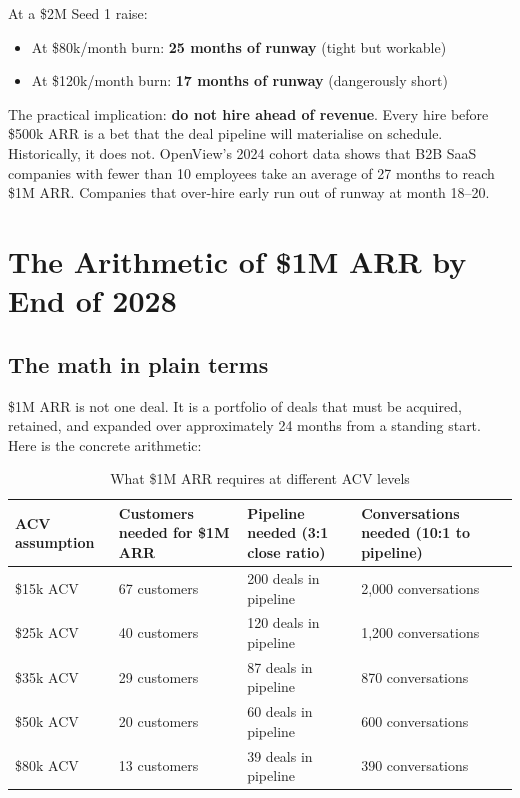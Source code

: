 At a \$2M Seed 1 raise:
\begin{itemize}[leftmargin=1.5em,itemsep=2pt]
  \item At \$80k/month burn: \textbf{25 months of runway} (tight but workable)
  \item At \$120k/month burn: \textbf{17 months of runway} (dangerously short)
\end{itemize}

The practical implication: \textbf{do not hire ahead of revenue}. Every hire
before \$500k ARR is a bet that the deal pipeline will materialise on schedule.
Historically, it does not. OpenView's 2024 cohort data shows that B2B SaaS
companies with fewer than 10 employees take an average of 27 months to reach
\$1M ARR. Companies that over-hire early run out of runway at month 18--20.

\section{The Arithmetic of \$1M ARR by End of 2028}

\subsection{The math in plain terms}

\$1M ARR is not one deal. It is a portfolio of deals that must be acquired,
retained, and expanded over approximately 24 months from a standing start.
Here is the concrete arithmetic:

\begin{table}[H]
\centering
\renewcommand{\arraystretch}{1.55}
\begin{tabularx}{\textwidth}{@{}lXXX@{}}
\toprule
\textbf{ACV assumption} & \textbf{Customers needed for \$1M ARR} & \textbf{Pipeline needed (3:1 close ratio)} & \textbf{Conversations needed (10:1 to pipeline)} \\
\midrule
\$15k ACV & 67 customers & 200 deals in pipeline & 2,000 conversations \\
\$25k ACV & 40 customers & 120 deals in pipeline & 1,200 conversations \\
\$35k ACV & 29 customers & 87 deals in pipeline & 870 conversations \\
\$50k ACV & 20 customers & 60 deals in pipeline & 600 conversations \\
\$80k ACV & 13 customers & 39 deals in pipeline & 390 conversations \\
\bottomrule
\end{tabularx}
\caption{What \$1M ARR requires at different ACV levels}
\end{table}

